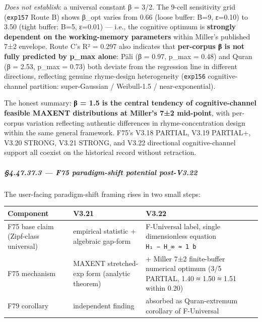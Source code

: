 \documentclass[
]{article}
\newcounter{none} %
\begin{document}
\emph{Does not establish}: a universal constant β = 3/2. The 9-cell
sensitivity grid (\texttt{exp157} Route B) shows β\_opt varies from 0.66
(loose buffer: B=9, ε=0.10) to 3.50 (tight buffer: B=5, ε=0.01) ---
i.e., the cognitive optimum is \textbf{strongly dependent on the
working-memory parameters} within Miller's published 7±2 envelope. Route
C's R² = 0.297 also indicates that \textbf{per-corpus β is not fully
predicted by p\_max alone}: Pāli (β = 0.97, p\_max = 0.48) and Quran (β
= 2.53, p\_max = 0.73) both deviate from the regression line in
different directions, reflecting genuine rhyme-design heterogeneity
(\texttt{exp156} cognitive-channel partition: super-Gaussian /
Weibull-1.5 / near-exponential).

The honest summary: \textbf{β = 1.5 is the central tendency of
cognitive-channel feasible MAXENT distributions at Miller's 7±2
mid-point}, with per-corpus variation reflecting authentic differences
in rhyme-concentration design within the same general framework. F75's
V3.18 PARTIAL, V3.19 PARTIAL+, V3.20 STRONG, V3.21 STRONG, and V3.22
directional cognitive-channel support all coexist on the historical
record without retraction.

\subparagraph{§4.47.37.3 --- F75 paradigm-shift potential
post-V3.22}\label{f75-paradigm-shift-potential-post-v3.22}

The user-facing paradigm-shift framing rises in two small steps:

{\def\LTcaptype{none} %
\begin{longtable}[]{@{}
  >{\raggedright\arraybackslash}p{}
  >{\raggedleft\arraybackslash}p{}
  >{\raggedleft\arraybackslash}p{}@{}}
\toprule\noalign{}
\begin{minipage}[b]{\linewidth}\raggedright
Component
\end{minipage} & \begin{minipage}[b]{\linewidth}\raggedleft
V3.21
\end{minipage} & \begin{minipage}[b]{\linewidth}\raggedleft
V3.22
\end{minipage} \\
\midrule\noalign{}
\endhead
\bottomrule\noalign{}
\endlastfoot
F75 base claim (Zipf-class universal) & empirical statistic + algebraic
gap-form & F-Universal label, single dimensionless equation
\texttt{H₁\ −\ H\_∞\ ≈\ 1\ b} \\
F75 mechanism & MAXENT stretched-exp form (analytic theorem) & + Miller
7±2 finite-buffer numerical optimum (3/5 PARTIAL, 1.40 ≈ 1.50 ≈ 1.51
within 0.20) \\
F79 corollary & independent finding & absorbed as Quran-extremum
corollary of F-Universal \\
\end{longtable}
}
\end{document}

